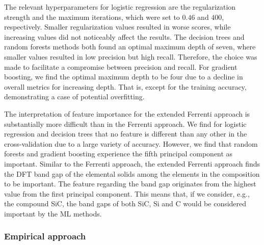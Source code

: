 \documentclass[superscriptaddress,unsortedaddress,
 amsmath,amssymb,
 aps,
]{revtex4-2}
\begin{document}
The relevant hyperparameters for logistic regression are the regularization strength and the maximum iterations, which were set to $0.46$ and $400$, respectively. Smaller regularization values resulted in worse scores, while increasing values did not noticeably affect the results. The decision trees and random forests methods both found an optimal maximum depth of seven, where smaller values resulted in low precision but high recall.  Therefore, the choice was made to facilitate a compromise between precision and recall. For gradient boosting, we find the optimal maximum depth to be four due to a decline in overall metrics for increasing depth.
That is, except for the training accuracy, demonstrating a case of potential overfitting.


The interpretation of feature importance for the extended Ferrenti approach is substantially more difficult than in the Ferrenti approach. We find for logistic regression and decision trees that no feature is different than any other in the cross-validation due to a large variety of accuracy. However, we find that random forests and gradient boosting experience the fifth principal component as important. 
Similar to the Ferrenti approach, the extended Ferrenti approach finds the DFT band gap of the elemental solids among the elements in the composition to be important. The feature regarding the band gap originates from the highest value from the first principal component. 
This means that, if we consider, e.g., the compound SiC, the band gaps of both SiC, Si and C would be considered important by the ML methods. 

\subsubsection*{Empirical approach}
\end{document}
